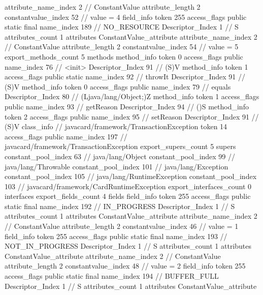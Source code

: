 {{{{{{{					attribute_name_index	2		// ConstantValue
					attribute_length	2
					constantvalue_index	52		// value = 4
				}
				}
			}
			field_info {
				token	255
				access_flags	public static final
				name_index	189		// NO_RESOURCE
				Descriptor_Index	1		// S
				attributes_count	1
				attributes {
				ConstantValue_attribute {
					attribute_name_index	2		// ConstantValue
					attribute_length	2
					constantvalue_index	54		// value = 5
				}
				}
			}
			}
			export_methods_count	5
			methods {
				method_info {
					token	0
					access_flags	public
					name_index	76		// <init>
					Descriptor_Index	91		// (S)V
				}
				method_info {
					token	1
					access_flags	public static
					name_index	92		// throwIt
					Descriptor_Index	91		// (S)V
				}
				method_info {
					token	0
					access_flags	public
					name_index	79		// equals
					Descriptor_Index	80		// (Ljava/lang/Object;)Z
				}
				method_info {
					token	1
					access_flags	public
					name_index	93		// getReason
					Descriptor_Index	94		// ()S
				}
				method_info {
					token	2
					access_flags	public
					name_index	95		// setReason
					Descriptor_Index	91		// (S)V
				}
			}
		}
		class_info {		// javacard/framework/TransactionException
			token	14
			access_flags	public
			name_index	197		// javacard/framework/TransactionException
			export_supers_count	5
			supers {
				constant_pool_index	63		// java/lang/Object
				constant_pool_index	99		// java/lang/Throwable
				constant_pool_index	101		// java/lang/Exception
				constant_pool_index	105		// java/lang/RuntimeException
				constant_pool_index	103		// javacard/framework/CardRuntimeException
			}
			export_interfaces_count	0
			interfaces {
			}
			export_fields_count	4
			fields {
			field_info {
				token	255
				access_flags	public static final
				name_index	192		// IN_PROGRESS
				Descriptor_Index	1		// S
				attributes_count	1
				attributes {
				ConstantValue_attribute {
					attribute_name_index	2		// ConstantValue
					attribute_length	2
					constantvalue_index	46		// value = 1
				}
				}
			}
			field_info {
				token	255
				access_flags	public static final
				name_index	193		// NOT_IN_PROGRESS
				Descriptor_Index	1		// S
				attributes_count	1
				attributes {
				ConstantValue_attribute {
					attribute_name_index	2		// ConstantValue
					attribute_length	2
					constantvalue_index	48		// value = 2
				}
				}
			}
			field_info {
				token	255
				access_flags	public static final
				name_index	194		// BUFFER_FULL
				Descriptor_Index	1		// S
				attributes_count	1
				attributes {
				ConstantValue_attribute {
}}}}}}}
